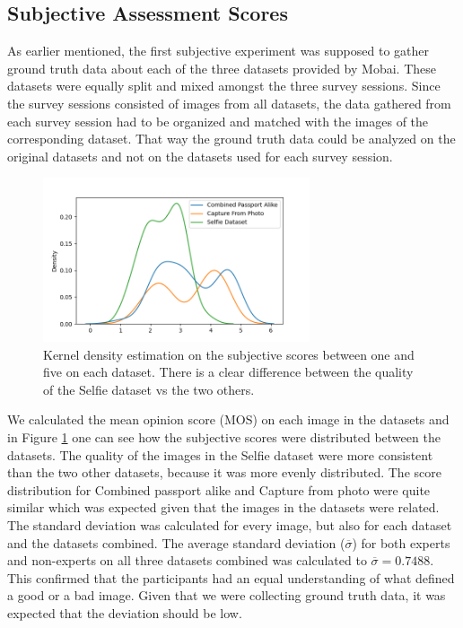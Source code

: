 \subsection{Subjective Assessment Scores}
As earlier mentioned, the first subjective experiment was supposed to gather ground truth data about each of the three datasets provided by Mobai. These datasets were equally split and mixed amongst the three survey sessions. Since the survey sessions consisted of images from all datasets, the data gathered from each survey session had to be organized and matched with the images of the corresponding dataset. That way the ground truth data could be analyzed on the original datasets and not on the datasets used for each survey session.

\begin{figure}[h]
    \centering
    \includegraphics[width=0.7\textwidth]{figures/KernelPlots2.png}
    \caption{Kernel density estimation on the subjective scores between one and five on each dataset. There is a clear difference between the quality of the Selfie dataset vs the two others.}
    \label{fig:kerneldensity}
\end{figure}

We calculated the mean opinion score (MOS) on each image in the datasets and in Figure \ref{fig:kerneldensity} one can see how the subjective scores were distributed between the datasets. The quality of the images in the Selfie dataset were more consistent than the two other datasets, because it was more evenly distributed. The score distribution for Combined passport alike and Capture from photo were quite similar which was expected given that the images in the datasets were related. The standard deviation was calculated for every image, but also for each dataset and the datasets combined. The average standard deviation ($\overline{\sigma}$) for both experts and non-experts on all three datasets combined was calculated to $\overline{\sigma} = 0.7488$. This confirmed that the participants had an equal understanding of what defined a good or a bad image. Given that we were collecting ground truth data, it was expected that the deviation should be low.   

